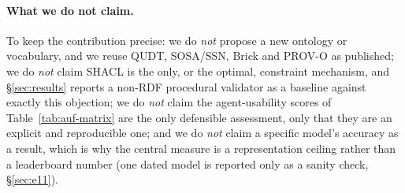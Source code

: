 \paragraph{What we do not claim.} To keep the contribution precise: we do
\emph{not} propose a new ontology or vocabulary, and we reuse QUDT, SOSA/SSN,
Brick and PROV-O as published; we do \emph{not} claim SHACL is the only, or the
optimal, constraint mechanism, and \S\ref{sec:results} reports a non-RDF
procedural validator as a baseline against exactly this objection; we do
\emph{not} claim the agent-usability scores of Table~\ref{tab:auf-matrix} are the
only defensible assessment, only that they are an explicit and reproducible one;
and we do \emph{not} claim a specific model's accuracy as a result, which is why
the central measure is a representation ceiling rather than a leaderboard number
(one dated model is reported only as a sanity check, \S\ref{sec:e11}).
